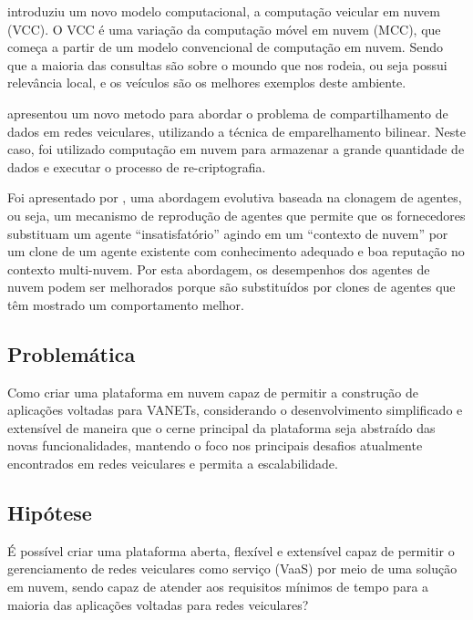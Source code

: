 \documentclass[
	12pt,				%
	oneside,			%
	a4paper,			%
	english,			%
	brazil				%
	]{abntex2ppgsi}
\begin{document}
  introduziu um novo modelo computacional, a computação veicular em nuvem  (VCC). O VCC é uma variação da computação móvel em nuvem (MCC), que começa a partir de um modelo convencional de computação em nuvem. Sendo que a maioria das consultas são sobre o moundo que nos rodeia, ou seja possui relevância local, e os veículos são os melhores exemplos deste ambiente.

 apresentou um novo metodo para abordar o problema de compartilhamento de dados em redes veiculares, utilizando a técnica de emparelhamento bilinear. Neste caso, foi utilizado computação em nuvem para armazenar a grande quantidade de dados e executar o processo de re-criptografia.

 Foi apresentado por , uma abordagem evolutiva baseada na clonagem de agentes, ou seja, um mecanismo de reprodução de agentes que permite que os fornecedores substituam um agente ``insatisfatório'' agindo em um ``contexto de nuvem'' por um clone de um agente existente com conhecimento adequado e boa reputação no contexto multi-nuvem. Por esta abordagem, os desempenhos dos agentes de nuvem podem ser melhorados porque são substituídos por clones de agentes que têm mostrado um comportamento melhor.

%

\subsection{Problemática}

Como criar uma plataforma em nuvem capaz de permitir a construção de aplicações voltadas para VANETs, considerando o desenvolvimento simplificado e extensível de maneira que o cerne principal da plataforma seja abstraído das novas funcionalidades, mantendo o foco nos principais desafios atualmente encontrados em redes veiculares e permita a escalabilidade. 

\subsection{Hipótese}

É possível criar uma plataforma aberta, flexível e extensível capaz de permitir o gerenciamento de redes veiculares como serviço (VaaS) por meio de uma solução em nuvem, sendo capaz de atender aos requisitos mínimos de tempo para a maioria das aplicações voltadas para redes veiculares?
\end{document}
